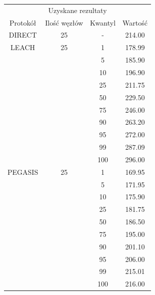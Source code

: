 \documentclass[a4paper,12pt,twoside,openany]{report}
\begin{document}
\begin{longtable}{*{4}{c}}
\toprule
\multicolumn{4}{c}{Uzyskane rezultaty} \\
Protokół	& Ilość węzłów	& Kwantyl	& Wartość \\
\midrule
\endhead
DIRECT	& 25 	& -	& 214.00 \\*
\midrule
LEACH	& 25	& 1	& 178.99 \\*
	&	& 5	& 185.90 \\*
	&	& 10	& 196.90 \\*
	&	& 25	& 211.75 \\*
	&	& 50	& 229.50 \\*
	&	& 75	& 246.00 \\*
	&	& 90	& 263.20 \\*
	&	& 95	& 272.00 \\*
	&	& 99	& 287.09 \\*
	&	& 100	& 296.00 \\*
\midrule
PEGASIS	& 25	& 1	& 169.95 \\*
	&	& 5	& 171.95 \\*
	&	& 10	& 175.90 \\*
	&	& 25	& 181.75 \\*
	&	& 50	& 186.50 \\*
	&	& 75	& 195.00 \\*
	&	& 90	& 201.10 \\*
	&	& 95	& 206.00 \\*
	&	& 99	& 215.01 \\*
	&	& 100	& 216.00 \\*
\bottomrule
\end{longtable}
\end{document}
